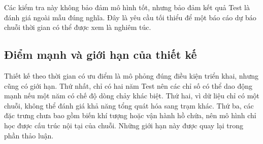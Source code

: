 Các kiểm tra này không bảo đảm mô hình tốt, nhưng bảo đảm kết quả Test là đánh giá
ngoài mẫu đúng nghĩa. Đây là yêu cầu tối thiểu để một báo cáo dự báo chuỗi thời gian
có thể được xem là nghiêm túc.

\subsection{Điểm mạnh và giới hạn của thiết kế}

Thiết kế theo thời gian có ưu điểm là mô phỏng đúng điều kiện triển khai, nhưng cũng
có giới hạn. Thứ nhất, chỉ có hai năm Test nên các chỉ số có thể dao động mạnh nếu
một năm có chế độ dòng chảy khác biệt. Thứ hai, vì dữ liệu chỉ có một chuỗi, không
thể đánh giá khả năng tổng quát hóa sang trạm khác. Thứ ba, các đặc trưng chưa bao
gồm biến khí tượng hoặc vận hành hồ chứa, nên mô hình chỉ học được cấu trúc nội tại
của chuỗi. Những giới hạn này được quay lại trong phần thảo luận.
